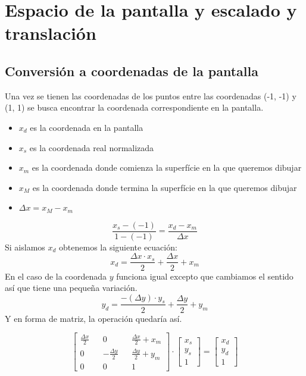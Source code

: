 \chapter{Espacio de la pantalla y escalado y translación}
\section{Conversión a coordenadas de la pantalla}
Una vez se tienen las coordenadas de los puntos entre las coordenadas (-1, -1) y (1, 1) se busca encontrar la coordenada correspondiente en la pantalla.
\begin{itemize}
  \item{\(x_d\) es la coordenada en la pantalla}
  \item{\(x_s\) es la coordenada real normalizada}  
  \item{\(x_m\) es la coordenada donde comienza la superfície en la que queremos dibujar}
  \item{\(x_M\) es la coordenada donde termina la superfície en la que queremos dibujar}  
  \item{\(\Delta x = x_M - x_m\)}
\end{itemize}
\begin{equation}
  \frac{x_s-(-1)}{1-(-1)} = \frac{x_d - x_m}{\Delta x}
\end{equation}
Si aislamos \(x_d\) obtenemos la siguiente ecuación:
\begin{equation}
  x_d = \frac{\Delta x \cdot x_s}{2}+\frac{\Delta x}{2}+x_m
\end{equation}
En el caso de la coordenada \(y\) funciona igual excepto que cambiamos el sentido así que tiene una pequeña variación.
\begin{equation}
  y_d = \frac{-(\Delta y) \cdot y_s}{2}+\frac{\Delta y}{2}+y_m
\end{equation}
Y en forma de matriz, la operación quedaría así.

\begin{equation}
  \begin{bmatrix}
     \frac{\Delta x}{2} && 0 && \frac{\Delta x}{2} + x_m\\
     0 && - \frac{\Delta y}{2} && \frac{\Delta y}{2} + y_m \\
     0 && 0 && 1
  \end{bmatrix}
  \cdot
  \begin{bmatrix}
    x_s\\
    y_s\\
    1
  \end{bmatrix}
  =
  \begin{bmatrix}
    x_d\\
    y_d\\
    1
  \end{bmatrix}
\end{equation}

